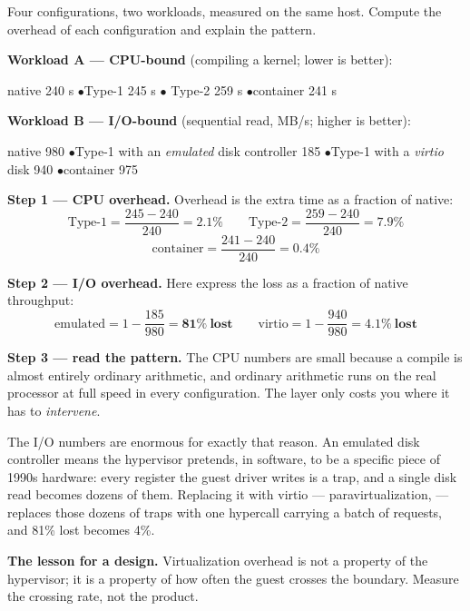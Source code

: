 \begin{worked}
Four configurations, two workloads, measured on the same host. Compute the
overhead of each configuration and explain the pattern.

\smallskip
\textbf{Workload A --- CPU-bound} (compiling a kernel; lower is better):
\begin{tight}
  \item native 240 s \quad $\bullet$\quad Type-1 245 s \quad $\bullet$\quad
        Type-2 259 s \quad $\bullet$\quad container 241 s
\end{tight}

\smallskip
\textbf{Workload B --- I/O-bound} (sequential read, MB/s; higher is better):
\begin{tight}
  \item native 980 \quad $\bullet$\quad Type-1 with an \emph{emulated} disk
        controller 185 \quad $\bullet$\quad Type-1 with a \emph{virtio} disk 940
        \quad $\bullet$\quad container 975
\end{tight}

\smallskip
\textbf{Step 1 --- CPU overhead.} Overhead is the extra time as a fraction of
native:
\[ \text{Type-1} = \frac{245 - 240}{240} = \mathbf{2.1\%} \qquad
   \text{Type-2} = \frac{259 - 240}{240} = \mathbf{7.9\%} \]
\[ \text{container} = \frac{241 - 240}{240} = \mathbf{0.4\%} \]

\smallskip
\textbf{Step 2 --- I/O overhead.} Here express the loss as a fraction of native
throughput:
\[ \text{emulated} = 1 - \frac{185}{980} = \mathbf{81\%\ lost} \qquad
   \text{virtio} = 1 - \frac{940}{980} = \mathbf{4.1\%\ lost} \]

\smallskip
\textbf{Step 3 --- read the pattern.} The CPU numbers are small because a
compile is almost entirely ordinary arithmetic, and ordinary arithmetic runs on
the real processor at full speed in every configuration. The layer only costs
you where it has to \emph{intervene}.

\smallskip
The I/O numbers are enormous for exactly that reason. An emulated disk
controller means the hypervisor pretends, in software, to be a specific piece
of 1990s hardware: every register the guest driver writes is a trap, and a
single disk read becomes dozens of them. Replacing it with virtio ---
paravirtualization,  --- replaces those dozens of traps with
one hypercall carrying a batch of requests, and 81\% lost becomes 4\%.

\smallskip
\textbf{The lesson for a design.} Virtualization overhead is not a property of
the hypervisor; it is a property of how often the guest crosses the boundary.
Measure the crossing rate, not the product.
\end{worked}

